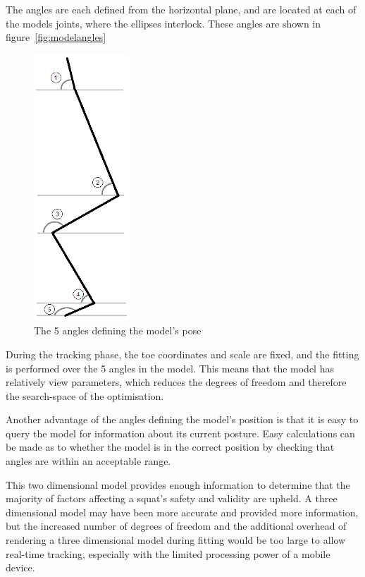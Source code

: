 The angles are each defined from the horizontal plane, and are located at each of the models joints, where the ellipses interlock. These angles are shown in figure~\ref{fig:modelangles}

\begin{figure}[H]
    \centering
	\includegraphics[height=10cm]{algorithm/images/model_angles}
\caption{The 5 angles defining the model's pose}
\label{fig:modelellipses}
\end{figure}

During the tracking phase, the toe coordinates and scale are fixed, and the fitting is performed over the 5 angles in the model. This means that the model has relatively view parameters, which reduces the degrees of freedom and therefore the search-space of the optimisation.

Another advantage of the angles defining the model's position is that it is easy to query the model for information about its current posture. Easy calculations can be made as to whether the model is in the correct position by checking that angles are within an acceptable range.

This two dimensional model provides enough information to determine that the majority of factors affecting a squat's safety and validity are upheld. A three dimensional model may have been more accurate and provided more information, but the increased number of degrees of freedom and the additional overhead of rendering a three dimensional model during fitting would be too large to allow real-time tracking, especially with the limited processing power of a mobile device.

